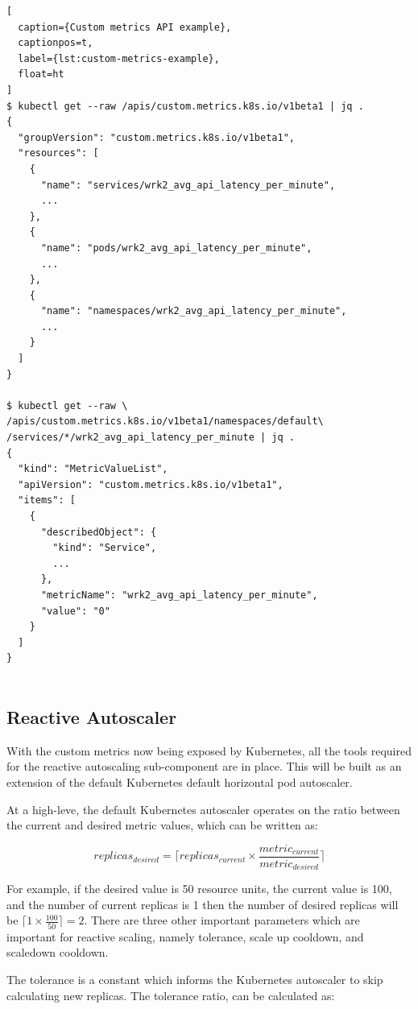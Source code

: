 \begin{lstlisting}[
  caption={Custom metrics API example},
  captionpos=t,
  label={lst:custom-metrics-example},
  float=ht
]
$ kubectl get --raw /apis/custom.metrics.k8s.io/v1beta1 | jq .
{
  "groupVersion": "custom.metrics.k8s.io/v1beta1",
  "resources": [
    {
      "name": "services/wrk2_avg_api_latency_per_minute",
      ...
    },
    {
      "name": "pods/wrk2_avg_api_latency_per_minute",
      ...
    },
    {
      "name": "namespaces/wrk2_avg_api_latency_per_minute",
      ...
    }
  ]
}

$ kubectl get --raw \
/apis/custom.metrics.k8s.io/v1beta1/namespaces/default\
/services/*/wrk2_avg_api_latency_per_minute | jq .
{
  "kind": "MetricValueList",
  "apiVersion": "custom.metrics.k8s.io/v1beta1",
  "items": [
    {
      "describedObject": {
        "kind": "Service",
        ...
      },
      "metricName": "wrk2_avg_api_latency_per_minute",
      "value": "0"
    }
  ]
}


\end{lstlisting}

\subsection{Reactive Autoscaler}
\label{subsec:reactive-auto-subsection}

With the custom metrics now being exposed by Kubernetes, all the tools required for the reactive autoscaling sub-component are in place. This will be built as an extension of the default Kubernetes default horizontal pod autoscaler.\par

At a high-leve, the default Kubernetes autoscaler operates on the ratio between the current and desired metric values, which can be written as:

\[ replicas_{desired} = \lceil replicas_{current} \times \frac{metric_{current}}{metric_{desired}}\rceil\]

For example, if the desired value is 50 resource units, the current value is 100, and the number of current replicas is 1 then the number of desired replicas will be $\lceil 1 \times \frac{100}{50}\rceil = 2$. There are three other important parameters which are important for reactive scaling, namely tolerance, scale up cooldown, and scaledown cooldown.\par

The tolerance is a constant which informs the Kubernetes autoscaler to skip calculating new replicas. The tolerance ratio, can be calculated as:

